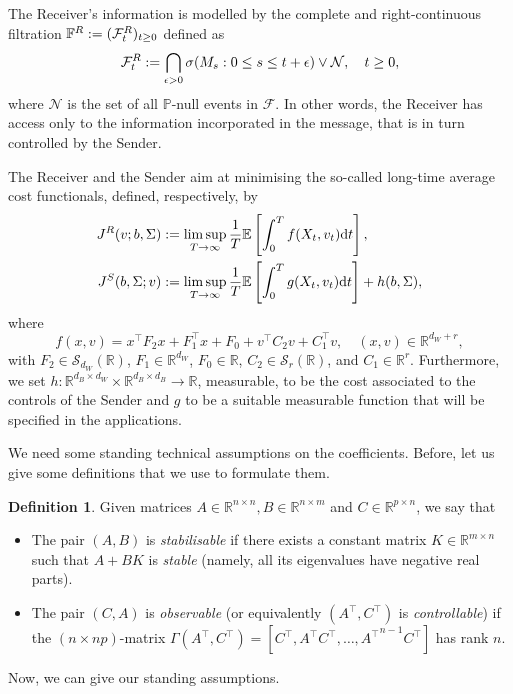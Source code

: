 \documentclass[a4paper,10pt]{article}
\newcommand{\EE}{\mathbb{E}}
\newcommand{\RR}{\mathbb{R}}
\newcommand{\D}{\mathrm{d}}
\theoremstyle{definition}
\newtheorem{definition}[theorem]{Definition}
\theoremstyle{plain}
\numberwithin{equation}{section}
\begin{document}
The Receiver's information is modelled by the complete and right-continuous filtration $\mathbb F^{\rm R} := (\mathcal F_t ^{\rm R})_{t \geq 0}$ defined as
\begin{equation}\label{eq:filtrations_R}
    \mathcal{F}_t^{\rm R} := \bigcap_{\epsilon >0} \sigma(M_s: 0 \le s \le t+ \epsilon ) \vee\mathcal N, \quad t \geq 0,
\end{equation} 
where $\mathcal N$ is the set of all $\mathbb P$-null events in $\mathcal F$. In other words, the Receiver has access only to the information incorporated in the message, that is in turn controlled by the Sender.

The Receiver and the Sender aim at minimising the so-called long-time average cost functionals, defined, respectively, by
\begin{align*}
    J^{\rm R} (v;b,\Sigma)& :=\limsup_{T \to \infty}\frac{1}{T}\EE \left[ \int_0^T f(X_t,v_t) \D t \right],
    \\
    J^{\rm S} (b,\Sigma ; v) &:= \limsup_{T\to \infty} \frac{1}{T} \EE \left[\int_0^T g(X_{t},v_t) \D t\right]+ h(b,\Sigma),  \end{align*}
where
\begin{equation}\label{eq:f}
    f(x,v)  = x^\top F_2 x +F_1 ^\top x + F_0 + v^\top C_2 v + C_1 ^\top v , \quad (x,v) \in \RR^{d_W + r},
\end{equation}
with 
$F_2 \in \mathcal S_{d_W}(\RR)$, $F_1 \in \RR^{d_W}$, $F_0 \in \mathbb R$, $C_2 \in \mathcal S_r(\RR)$, and  $C_1 \in \RR^{r}$.  
Furthermore, we set $h : \RR^{d_B \times d_W} \times \RR^{d_B \times d_B} \to \RR$, measurable, to be the cost associated to the controls of the Sender and $g$ to be a suitable measurable function that will be specified in the applications.

We need some standing technical assumptions on the coefficients. Before, let us give some definitions that we use to formulate them.
\begin{definition}\label{def:stab_obs}
Given matrices $A \in {\mathbb R}^{n \times n}, B \in {\mathbb R}^{n \times m}$ and $C \in {\mathbb R}^{p \times n}$, we say that 
\begin{itemize}
\item[a)] The pair $(A, B)$ is {\em{stabilisable}} if there exists a constant matrix $K \in {\mathbb R}^{m \times n}$ such that $A + B  K$ is {\em{stable}} (namely, all its eigenvalues have negative real parts).
\item[b)] The pair $(C, A)$ is {\em{observable}} (or equivalently $(A^\top, C^\top)$ is {\em{controllable}}) if the $(n \times np)$-matrix $\Gamma(A^\top,C^\top) =[ C^\top, A^\top C^\top , \ldots, {A^\top}^{n-1} C^\top ] $ has rank $n$.
\end{itemize}
\end{definition}
Now, we can give our standing assumptions.
\end{document}
